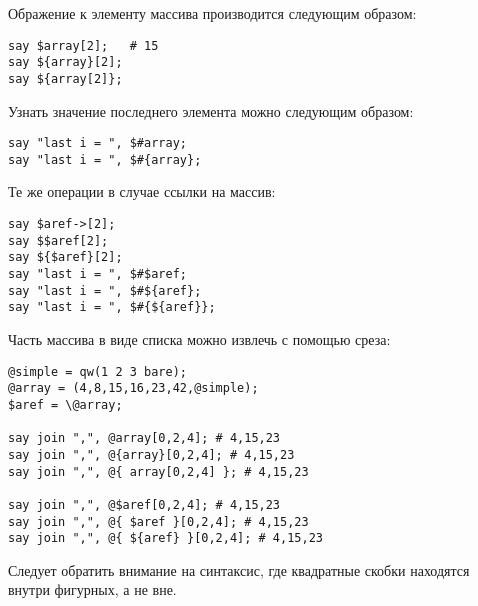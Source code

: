 Ображение к элементу массива производится следующим образом:
\begin{verbatim}
say $array[2];   # 15
say ${array}[2];
say ${array[2]};
\end{verbatim}
Узнать значение последнего элемента можно следующим образом:
\begin{verbatim}
say "last i = ", $#array;
say "last i = ", $#{array};
\end{verbatim}
Те же операции в случае ссылки на массив:
\begin{verbatim}
say $aref->[2];
say $$aref[2];
say ${$aref}[2];
say "last i = ", $#$aref;
say "last i = ", $#${aref};
say "last i = ", $#{${aref}};
\end{verbatim}

Часть массива в виде списка можно извлечь с помощью среза:
\begin{verbatim}
@simple = qw(1 2 3 bare);
@array = (4,8,15,16,23,42,@simple);
$aref = \@array;

say join ",", @array[0,2,4]; # 4,15,23
say join ",", @{array}[0,2,4]; # 4,15,23
say join ",", @{ array[0,2,4] }; # 4,15,23

say join ",", @$aref[0,2,4]; # 4,15,23
say join ",", @{ $aref }[0,2,4]; # 4,15,23
say join ",", @{ ${aref} }[0,2,4]; # 4,15,23
\end{verbatim}
Следует обратить внимание на синтаксис, где квадратные скобки находятся внутри фигурных, а не вне.
\newpage
